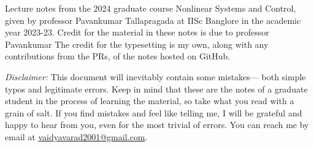 Lecture notes from the 2024 graduate course Nonlinear Systems and Control, given by professor
Pavankumar Tallapragada at IISc Banglore in the academic year 2023-23. Credit for the material in these notes
is due to professor
Pavankumar The credit for the typesetting is my own, along with any contributions from the PRs, of the notes hosted
on GitHub.

\textit{Disclaimer:} This document will inevitably contain some mistakes— both
simple typos and legitimate errors. Keep in mind that these are the notes of a graduate student in the process of learning the material, so take
what you read with a grain of salt. If you find mistakes and feel like telling
me, I will be grateful and happy to hear from you, even for the most trivial of
errors. You can reach me by email at
\href{mailto:vaidyavaraa2001@gmail.com}{vaidyavarad2001@gmail.com}.